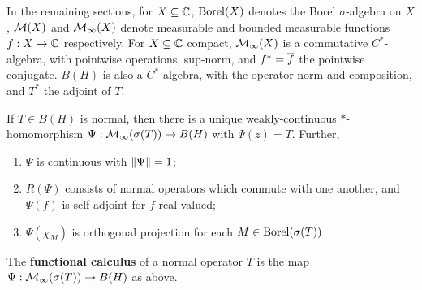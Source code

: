 \documentclass[10pt]{amsart}
\begin{document}
In the remaining sections, for $X \subseteq \mathbb{C}$, $\operatorname{Borel}(X)$ denotes the Borel $\sigma$-algebra on $X$, $\mathcal{M}(X)$ and $\mathcal{M}_\infty(X)$ denote measurable and bounded measurable functions $f : X \to \mathbb{C}$ respectively. For $X \subseteq \mathbb{C}$ compact, $\mathcal{M}_\infty(X)$ is a commutative $C^*$-algebra, with pointwise operations, sup-norm, and $f^* = \overline{f}$ the pointwise conjugate. $B(H)$ is also a $C^*$-algebra, with the operator norm and composition, and $T^*$ the adjoint of $T$.
\begin{proposition}\label{funccalc}
    If $T \in B(H)$ is normal, then there is a unique weakly-continuous $*$-homomorphism $\Psi : \mathcal{M}_\infty(\sigma(T)) \to B(H)$ with $\Psi(z) = T$. Further, 
    \begin{enumerate}
        \item $\Psi$ is continuous with $\left\| \Psi \right\| = 1$;
        \item $R(\Psi)$ consists of normal operators which commute with one another, and $\Psi(f)$ is self-adjoint for $f$ real-valued;
        \item $\Psi(\chi_M)$ is orthogonal projection for each $M \in \operatorname{Borel}(\sigma(T))$.
    \end{enumerate}
\end{proposition}
\begin{definition}
    The \textbf{functional calculus} of a normal operator $T$ is the map $\Psi : \mathcal{M}_\infty(\sigma(T)) \to B(H)$ as above.
\end{definition}



\end{document}
